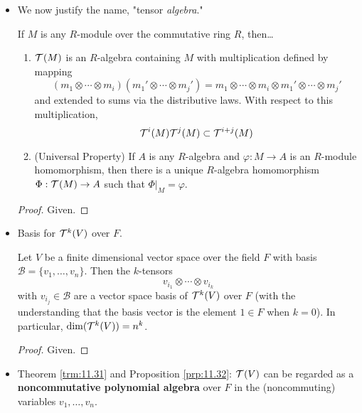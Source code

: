 \documentclass[../notes.tex]{subfiles}
\begin{document}
\begin{itemize}
    \item We now justify the name, "tensor \emph{algebra}."
    \begin{theorem}\label{trm:11.31}
        If $M$ is any $R$-module over the commutative ring $R$, then\dots
        \begin{enumerate}[ref={\thetheorem(\arabic*)}]
            \item \label{trm:11.31.1}$\ten{M}$ is an $R$-algebra containing $M$ with multiplication defined by mapping
            \begin{equation*}
                (m_1\otimes\cdots\otimes m_i)(m_1'\otimes\cdots\otimes m_j') = m_1\otimes\cdots\otimes m_i\otimes m_1'\otimes\cdots\otimes m_j'
            \end{equation*}
            and extended to sums via the distributive laws. With respect to this multiplication,
            \begin{equation*}
                \ten[i]{M}\ten[j]{M} \subset \ten[i+j]{M}
            \end{equation*}
            \item \label{trm:11.31.2}(Universal Property) If $A$ is any $R$-algebra and $\varphi:M\to A$ is an $R$-module homomorphism, then there is a unique $R$-algebra homomorphism $\Phi:\ten{M}\to A$ such that $\Phi|_M=\varphi$.
        \end{enumerate}
        \begin{proof}
            Given.
        \end{proof}
    \end{theorem}
    \item Basis for $\ten[k]{V}$ over $F$.
    \begin{proposition}\label{prp:11.32}
        Let $V$ be a finite dimensional vector space over the field $F$ with basis $\mathcal{B}=\{v_1,\dots,v_n\}$. Then the $k$-tensors
        \begin{equation*}
            v_{i_1}\otimes\cdots\otimes v_{i_k}
        \end{equation*}
        with $v_{i_j}\in\mathcal{B}$ are a vector space basis of $\ten[k]{V}$ over $F$ (with the understanding that the basis vector is the element $1\in F$ when $k=0$). In particular, $\dim(\ten[k]{V})=n^k$.
        \begin{proof}
            Given.
        \end{proof}
    \end{proposition}
    \item Theorem \ref{trm:11.31} and Proposition \ref{prp:11.32}: $\ten{V}$ can be regarded as a \textbf{noncommutative polynomial algebra} over $F$ in the (noncommuting) variables $v_1,\dots,v_n$.

\end{itemize}
\end{document}
